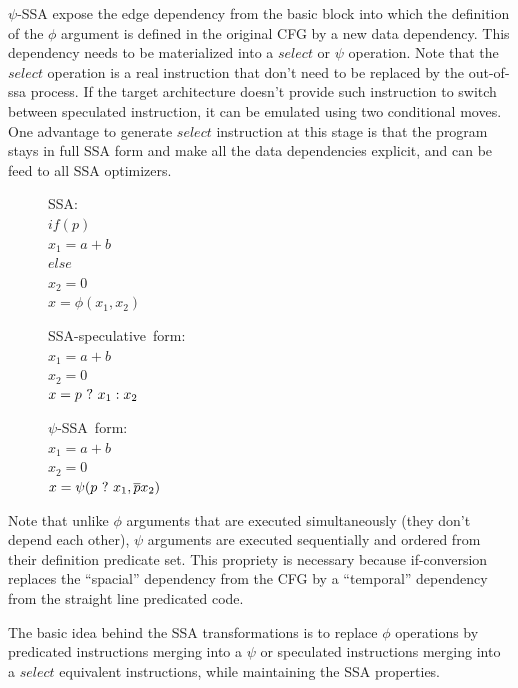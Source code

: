 $\psi$-SSA expose the edge dependency from the basic block into which the definition of the $\phi$ argument is defined in the original CFG by a new data dependency. This dependency needs to be materialized into a $select$ or $\psi$ operation. Note that the $select$ operation is a real instruction that don't need to be replaced by the out-of-ssa process. If the target architecture doesn't provide such instruction to switch between speculated instruction, it can be emulated using two conditional moves. One advantage to generate $select$ instruction at this stage is that the program stays in full SSA form and make all the data dependencies explicit, and can be feed to all SSA optimizers. 

\begin{figure}
\begin{minipage}[t]{4cm}
\mbox{SSA:} \\
$ if (p) $ \\
$   x_1 = a+b $ \\
$ else $ \\
$   x_2 = 0 $ \\
$ x = \phi (x_1, x_2) $ \\
\end{minipage}
\begin{minipage}[t]{4cm}
\mbox{SSA-speculative form:} \\
$x_1 = a + b $ \\
$x_2 = 0 $ \\
$x = p ~?~  x_1 : x_2$ \\
\end{minipage}
\begin{minipage}[t]{4cm}
\mbox{$\psi$-SSA form:} \\
$x_1 = a + b $ \\
$x_2 = 0 $\\
$x = \psi (p ~?~ x_1, \overline{p} x_2) $ \\
\end{minipage}
\end{figure}

Note that unlike $\phi$ arguments that are executed simultaneously (they don't depend each other), $\psi$ arguments are executed sequentially and ordered from their definition predicate set. This propriety is necessary because if-conversion replaces the ``spacial'' dependency from the CFG by a ``temporal'' dependency from the straight line predicated code.

The basic idea behind the SSA transformations is to replace $\phi$ operations by predicated instructions merging into a $\psi$ or speculated instructions merging into a $select$ equivalent instructions, while maintaining the SSA properties.

